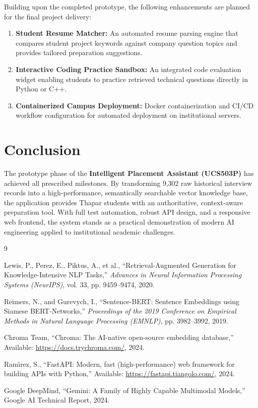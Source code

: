 \documentclass[11pt]{article}
\begin{document}
Building upon the completed prototype, the following enhancements are planned for the final project delivery:
\begin{enumerate}[leftmargin=1.5em]
    \item \textbf{Student Resume Matcher:} An automated resume parsing engine that compares student project keywords against company question topics and provides tailored preparation suggestions.
    \item \textbf{Interactive Coding Practice Sandbox:} An integrated code evaluation widget enabling students to practice retrieved technical questions directly in Python or C++.
    \item \textbf{Containerized Campus Deployment:} Docker containerization and CI/CD workflow configuration for automated deployment on institutional servers.
\end{enumerate}

\section{Conclusion}

The prototype phase of the \textbf{Intelligent Placement Assistant (UCS503P)} has achieved all prescribed milestones. By transforming 9,302 raw historical interview records into a high-performance, semantically searchable vector knowledge base, the application provides Thapar students with an authoritative, context-aware preparation tool. With full test automation, robust API design, and a responsive web frontend, the system stands as a practical demonstration of modern AI engineering applied to institutional academic challenges.

\begin{thebibliography}{9}

Lewis, P., Perez, E., Piktus, A., et al.,
``Retrieval-Augmented Generation for Knowledge-Intensive NLP Tasks,''
\textit{Advances in Neural Information Processing Systems (NeurIPS)}, vol. 33, pp. 9459--9474, 2020.

Reimers, N., and Gurevych, I.,
``Sentence-BERT: Sentence Embeddings using Siamese BERT-Networks,''
\textit{Proceedings of the 2019 Conference on Empirical Methods in Natural Language Processing (EMNLP)}, pp. 3982--3992, 2019.

Chroma Team,
``Chroma: The AI-native open-source embedding database,''
Available: \url{https://docs.trychroma.com/}, 2024.

Ram{\'\i}rez, S.,
``FastAPI: Modern, fast (high-performance) web framework for building APIs with Python,''
Available: \url{https://fastapi.tiangolo.com/}, 2024.

Google DeepMind,
``Gemini: A Family of Highly Capable Multimodal Models,''
Google AI Technical Report, 2024.

\end{thebibliography}
\end{document}
